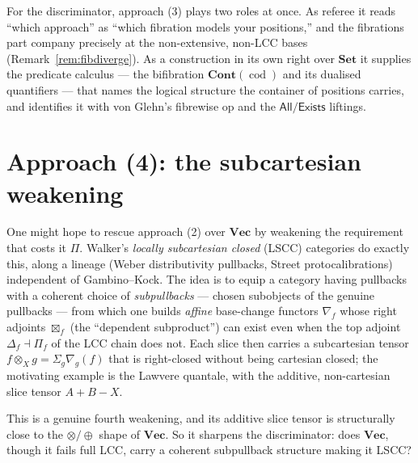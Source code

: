 \documentclass[11pt]{amsart}
\theoremstyle{plain}
\theoremstyle{definition}
\theoremstyle{remark}
\newcommand{\Set}{\mathbf{Set}}
\newcommand{\Vect}{\mathbf{Vec}}
\newcommand{\Cont}{\mathbf{Cont}}
\DeclareMathOperator{\cod}{cod}
\begin{document}
For the discriminator, approach (3) plays two roles at once. As referee it reads ``which approach'' as
``which fibration models your positions,'' and the fibrations part company precisely at the
non-extensive, non-LCC bases (Remark~\ref{rem:fibdiverge}). As a construction in its own right over
$\Set$ it supplies the predicate calculus --- the bifibration $\Cont(\cod)$ and its dualised
quantifiers --- that names the logical structure the container of positions carries, and identifies it
with von Glehn's fibrewise op and the $\mathsf{All}/\mathsf{Exists}$ liftings.

\section{Approach (4): the subcartesian weakening}\label{sec:subcartesian}

One might hope to rescue approach (2) over $\Vect$ by weakening the requirement that costs it $\Pi$.
Walker's \emph{locally subcartesian closed} (LSCC) categories \cite{Walker} do exactly this, along a
lineage (Weber distributivity pullbacks, Street protocalibrations) independent of Gambino--Kock. The
idea is to equip a category having pullbacks with a coherent choice of \emph{subpullbacks} --- chosen
subobjects of the genuine pullbacks --- from which one builds \emph{affine} base-change functors
$\nabla_f$ whose right adjoints $\boxtimes_f$ (the ``dependent subproduct'') can exist even when the
top adjoint $\Delta_f\dashv\Pi_f$ of the LCC chain does not. Each slice then carries a subcartesian
tensor $f\otimes_X g=\Sigma_g\nabla_g(f)$ that is right-closed without being cartesian closed; the
motivating example is the Lawvere quantale, with the additive, non-cartesian slice tensor $A+B-X$.

This is a genuine fourth weakening, and its additive slice tensor is structurally close to the
$\otimes/\oplus$ shape of $\Vect$. So it sharpens the discriminator: does $\Vect$, though it fails
full LCC, carry a coherent subpullback structure making it LSCC?
\end{document}
